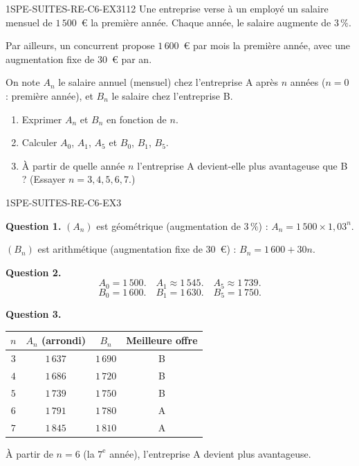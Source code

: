 
\begin{exercice}{1SPE-SUITES-RE-C6-EX3}{1}{12}
Une entreprise verse à un employé un salaire mensuel de $1\,500$~€ la première année. Chaque année, le salaire augmente de $3\,\%$.

Par ailleurs, un concurrent propose $1\,600$~€ par mois la première année, avec une augmentation fixe de $30$~€ par an.

On note $A_n$ le salaire annuel (mensuel) chez l'entreprise A après $n$ années ($n = 0$ : première année), et $B_n$ le salaire chez l'entreprise B.
\begin{enumerate}
  \item Exprimer $A_n$ et $B_n$ en fonction de $n$.
  \item Calculer $A_0$, $A_1$, $A_5$ et $B_0$, $B_1$, $B_5$.
  \item À partir de quelle année $n$ l'entreprise A devient-elle plus avantageuse que B ? (Essayer $n = 3, 4, 5, 6, 7$.)
\end{enumerate}
\end{exercice}


\begin{corrige}{1SPE-SUITES-RE-C6-EX3}

\textbf{Question 1.} $(A_n)$ est géométrique (augmentation de $3\,\%$) : $A_n = 1\,500 \times 1{,}03^n$.

$(B_n)$ est arithmétique (augmentation fixe de $30$~€) : $B_n = 1\,600 + 30n$.

\textbf{Question 2.}
\[
A_0 = 1\,500. \quad A_1 \approx 1\,545. \quad A_5 \approx 1\,739.
\]
\[
B_0 = 1\,600. \quad B_1 = 1\,630. \quad B_5 = 1\,750.
\]

\textbf{Question 3.}

\begin{center}
\begin{tabular}{|c|c|c|c|}
\hline
$n$ & $A_n$ (arrondi) & $B_n$ & Meilleure offre \\
\hline
$3$ & $1\,637$ & $1\,690$ & B \\
$4$ & $1\,686$ & $1\,720$ & B \\
$5$ & $1\,739$ & $1\,750$ & B \\
$6$ & $1\,791$ & $1\,780$ & A \\
$7$ & $1\,845$ & $1\,810$ & A \\
\hline
\end{tabular}
\end{center}

À partir de $n = 6$ (la $7^{\text{e}}$ année), l'entreprise A devient plus avantageuse.

\end{corrige}
